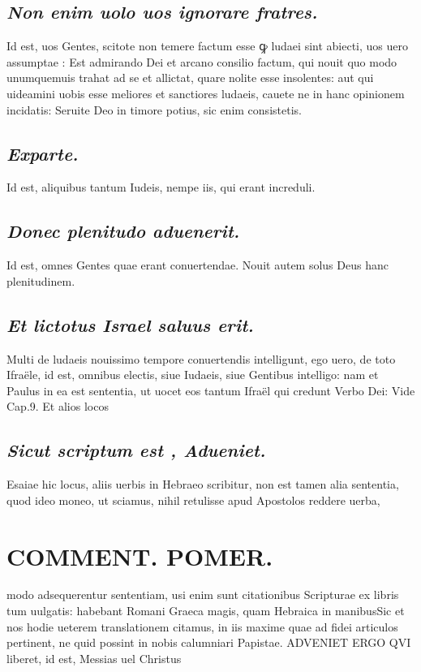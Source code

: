 \documentclass{article}
\begin{document}
\begin{pages}
\subsection*{\textit{Non enim uolo uos ignorare fratres. }}\pstart Id est, uos Gentes, scitote non temere factum esse ꝙ ludaei sint abiecti, uos uero assumptae : Est admirando Dei et arcano consilio factum, qui nouit quo modo unumquemuis trahat ad se et allictat, quare nolite esse insolentes: aut qui uideamini uobis esse meliores et sanctiores ludaeis, cauete ne in hanc opinionem incidatis: Seruite Deo in timore potius, sic enim consistetis.  \pend
{}
{}
\subsection*{\textit{Exparte. }}\pstart Id est, aliquibus tantum Iudeis, nempe iis, qui erant increduli.   \pend
{}
{}
\subsection*{\textit{Donec plenitudo aduenerit. }}\pstart Id est, omnes Gentes quae erant conuertendae. Nouit autem solus Deus hanc plenitudinem.  \pend
{}
{}
\subsection*{\textit{Et lictotus Israel saluus erit. }}\pstart Multi de ludaeis nouissimo tempore conuertendis intelligunt, ego uero, de toto Ifraële, id est, omnibus electis, siue Iudaeis, siue Gentibus intelligo: nam et Paulus in ea est sententia, ut uocet eos tantum Ifraël qui credunt Verbo Dei: Vide Cap.9. Et alios locos  \pend
{}
{}
\subsection*{\textit{Sicut scriptum est , Adueniet. }}\pstart Esaiae hic locus, aliis uerbis in Hebraeo scribitur, non est tamen alia sententia, quod ideo moneo, ut sciamus, nihil retulisse apud Apostolos reddere uerba,  \pend
\section*{COMMENT. POMER.  }\pstart modo adsequerentur sententiam, usi enim sunt citationibus Scripturae ex libris tum uulgatis: habebant Romani Graeca magis, quam Hebraica in manibusSic et nos hodie ueterem translationem citamus, in iis maxime quae ad fidei articulos pertinent, ne quid possint in nobis calumniari Papistae. ADVENIET ERGO QVI liberet, id est, Messias uel Christus\pend
{}
{}

\end{pages}
\end{document}
